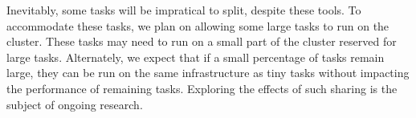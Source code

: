 Inevitably, some tasks will be impratical to split, despite these tools.
To accommodate these 
tasks, we plan on allowing some large tasks to run on the cluster. These tasks
may need to run on a small part of the cluster reserved for large tasks.
Alternately, we expect that if a small percentage of tasks remain large, they
can be run on the same infrastructure as tiny tasks without impacting the
performance of remaining tasks. Exploring the effects of such sharing is
the subject of ongoing research.

